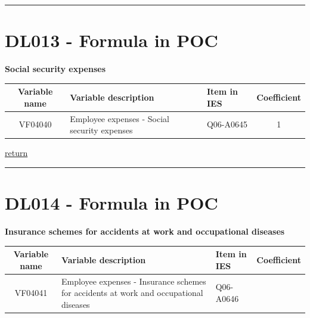 \documentclass[]{book}
\begin{document}
\begin{center}\rule{0.5\linewidth}{\linethickness}\end{center}

\hypertarget{dl013---formula-in-poc}{%
\section{DL013 - Formula in POC}\label{dl013---formula-in-poc}}

\textbf{Social security expenses}

\begin{longtable}[]{@{}cllc@{}}
\toprule
Variable name & Variable description & Item in IES & Coefficient\tabularnewline
\midrule
\endhead
VF04040 & Employee expenses - Social security expenses & Q06-A0645 & 1\tabularnewline
\bottomrule
\end{longtable}

\protect\hyperlink{b3.-profit-and-loss-statement-variables}{return}

\begin{center}\rule{0.5\linewidth}{\linethickness}\end{center}

\hypertarget{dl014---formula-in-poc}{%
\section{DL014 - Formula in POC}\label{dl014---formula-in-poc}}

\textbf{Insurance schemes for accidents at work and occupational diseases}

\begin{longtable}[]{@{}cllc@{}}
\toprule
\begin{minipage}[b]{0.13\columnwidth}\centering
Variable name\strut
\end{minipage} & \begin{minipage}[b]{0.31\columnwidth}\raggedright
Variable description\strut
\end{minipage} & \begin{minipage}[b]{0.33\columnwidth}\raggedright
Item in IES\strut
\end{minipage} & \begin{minipage}[b]{0.11\columnwidth}\centering
Coefficient\strut
\end{minipage}\tabularnewline
\midrule
\endhead
\begin{minipage}[t]{0.13\columnwidth}\centering
VF04041\strut
\end{minipage} & \begin{minipage}[t]{0.31\columnwidth}\raggedright
Employee expenses - Insurance schemes for accidents at work and occupational diseases\strut
\end{minipage} & \begin{minipage}[t]{0.33\columnwidth}\raggedright
Q06-A0646\strut
\end{minipage} & \begin{minipage}[t]{0.11\columnwidth}\centering
1\strut
\end{minipage}\tabularnewline
\bottomrule
\end{longtable}
\end{document}
